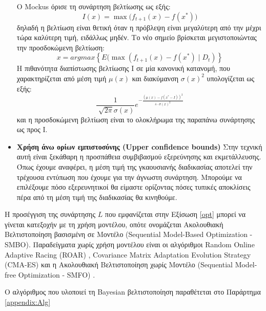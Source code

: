 \begin{itemize}
 		O Mockus όρισε τη συνάρτηση βελτίωσης ως εξής:
 		\begin{equation}
 		I(x)= \max \Big( f_{t+1} (x) - f(x^*) \Big)
 		\end{equation}
 		δηλαδή η βελτίωση είναι θετική όταν η πρόβλεψη είναι μεγαλύτερη από την μέχρι τώρα καλύτερη τιμή, ειδάλλως μηδέν. Το νέο σημείο βρίσκεται μεγιστοποιώντας την προσδοκώμενη βελτίωση:
 		\begin{equation}
 		x=argmax \left \{ E( \max( f_{t+1}(x) - f(x^*) \mid D_t) \right \}
 		\end{equation}
 		H πιθανότητα διαπίστωσης βελτίωσης I σε μία κανονική κατανομή, που χαρακτηρίζεται από μέση τιμή $\mu(x)$ και διακύμανση $\sigma(x)^2$ υπολογίζεται ως εξής:
 		\begin{equation}\frac{1}{\sqrt[]{2 \pi} \sigma(x)} e^{- \frac{(\mu(x)- f(x^*-I))^2}{s \cdot \sigma(x)^2}}
 		\end{equation} 
 		και η προσδοκώμενη βελτίωση είναι το ολοκλήρωμα της παραπάνω συνάρτησης ως προς I.
 		\item \textbf{Χρήση άνω ορίων εμπιστοσύνης (Upper confidence bounds)} Στην τεχνική αυτή είναι ξεκάθαρη η προσπάθεια συμβιβασμού εξερεύνησης και εκμετάλλευσης. Όπως έχουμε αναφέρει, η μέση τιμή της γκαουσιανής διαδικασίας αποτελεί την τρέχουσα εντύπωση που έχουμε για την άγνωστη συνάρτηση. Μπορούμε να επιλέξουμε πόσο εξερευνητικοί θα είμαστε ορίζοντας πόσες τυπικές αποκλίσεις πέρα από τη μέση τιμή της διαδικασίας θα κινηθούμε.
 	\end{itemize} 	
 	
 	Η προσέγγιση της συνάρτησης $L$ που εμφανίζεται στην Εξίσωση \ref{opt} μπορεί να γίνεται κατεξοχήν με τη χρήση μοντέλου, οπότε ονομάζεται Ακολουθιακή Βελτιστοποίηση βασισμένη σε Μοντέλο (Sequential Model-Based Optimization - \gls{SMBO}). Παραδείγματα χωρίς χρήση μοντέλου είναι οι αλγόριθμοι Random Online Adaptive Racing (ROAR) \citep{Hutter2011}, Covari\-ance Matrix Adaptation Evolution Strategy (CMA-ES) \citep{DBLP:journals/corr/LoshchilovH16} και η Ακολουθιακή Βελτιστοποίηση χωρίς Μοντέλο (Sequential Model-free Optimization - \gls{SMFO})  \citep{7373431}. 
 	
 	
 Ο αλγόριθμος που υλοποιεί τη Bayesian βελτιστοποίηση παραθέτεται στο Παράρτημα \ref{appendix:Alg}
